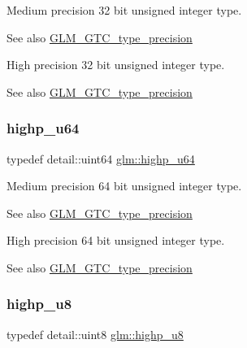 Medium precision 32 bit unsigned integer type. \begin{DoxySeeAlso}{See also}
\hyperlink{group__gtc__type__precision}{G\+L\+M\+\_\+\+G\+T\+C\+\_\+type\+\_\+precision}
\end{DoxySeeAlso}
High precision 32 bit unsigned integer type. \begin{DoxySeeAlso}{See also}
\hyperlink{group__gtc__type__precision}{G\+L\+M\+\_\+\+G\+T\+C\+\_\+type\+\_\+precision} 
\end{DoxySeeAlso}
\mbox{\label{group__gtc__type__precision_ga6006ea883d3c0491791650b2fb84de39}} 
\subsubsection{\texorpdfstring{highp\+\_\+u64}{highp\_u64}}
{\footnotesize\ttfamily typedef detail\+::uint64 \hyperlink{group__gtc__type__precision_ga6006ea883d3c0491791650b2fb84de39}{glm\+::highp\+\_\+u64}}

Medium precision 64 bit unsigned integer type. \begin{DoxySeeAlso}{See also}
\hyperlink{group__gtc__type__precision}{G\+L\+M\+\_\+\+G\+T\+C\+\_\+type\+\_\+precision}
\end{DoxySeeAlso}
High precision 64 bit unsigned integer type. \begin{DoxySeeAlso}{See also}
\hyperlink{group__gtc__type__precision}{G\+L\+M\+\_\+\+G\+T\+C\+\_\+type\+\_\+precision} 
\end{DoxySeeAlso}
\mbox{\label{group__gtc__type__precision_ga8a60abe782749c504fb5ae51eb8b49cc}} 
\subsubsection{\texorpdfstring{highp\+\_\+u8}{highp\_u8}}
{\footnotesize\ttfamily typedef detail\+::uint8 \hyperlink{group__gtc__type__precision_ga8a60abe782749c504fb5ae51eb8b49cc}{glm\+::highp\+\_\+u8}}

